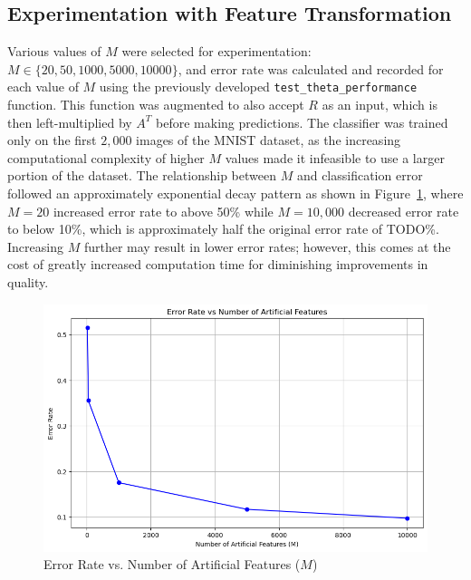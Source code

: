 \documentclass[conference]{IEEEtran}
\begin{document}
\subsection{Experimentation with Feature Transformation}

Various values of $M$ were selected for experimentation: $M \in \{20, 50, 1000, 5000, 10000\}$, and error rate was calculated and recorded for each value of $M$ using the previously developed \texttt{test\_theta\_performance} function. This function was augmented to also accept $R$ as an input, which is then left-multiplied by $A^T$ before making predictions. The classifier was trained only on the first $2,000$ images of the MNIST dataset, as the increasing computational complexity of higher $M$ values made it infeasible to use a larger portion of the dataset. The relationship between $M$ and classification error followed an approximately exponential decay pattern as shown in Figure~\ref{fig:feature_transformation_error_rate}, where $M=20$ increased error rate to above 50\% while $M = 10,000$ decreased error rate to below 10\%, which is approximately half the original error rate of TODO\%. Increasing $M$ further may result in lower error rates; however, this comes at the cost of greatly increased computation time for diminishing improvements in quality.

\begin{figure}[htbp]
  \centerline{\includegraphics[scale=0.4]{figures/feature_transformation_error_rate.png}}
  \caption{Error Rate vs. Number of Artificial Features ($M$)}
  \label{fig:feature_transformation_error_rate}
\end{figure}  
\end{document}
